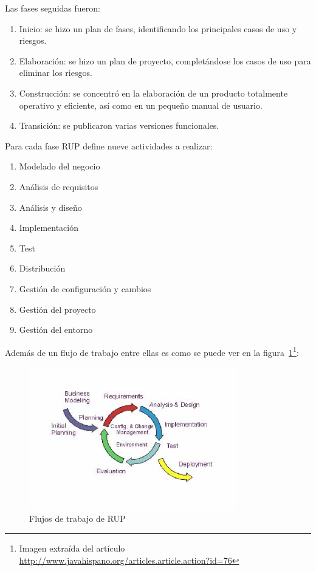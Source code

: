 Las fases seguidas fueron:

\begin{enumerate}
  \item Inicio: se hizo un plan de fases, identificando los principales 
	casos de uso y riesgos.
  \item Elaboración: se hizo un plan de proyecto, completándose los casos 
	de uso para eliminar los riesgos.
  \item Construcción: se concentró en la elaboración de un producto totalmente 
	operativo y eficiente, así como en un pequeño manual de usuario.
  \item Transición: se publicaron varias versiones funcionales.
\end{enumerate}

Para cada fase RUP define nueve actividades a realizar:

\begin{enumerate}
 \item Modelado del negocio
 \item Análisis de requisitos
 \item Análisis y diseño
 \item Implementación
 \item Test
 \item Distribución
 \item Gestión de configuración y cambios
 \item Gestión del proyecto
 \item Gestión del entorno
\end{enumerate}

Además de un flujo de trabajo entre ellas es como se puede ver en la 
figura~\ref{fig:RUPWorkflow}\footnote{Imagen extraída del artículo
\url{http://www.javahispano.org/articles.article.action?id=76}}:

\begin{figure}[ht]
	\centering
	\includegraphics[width=9cm]{images/workflow-rup.png}
	\caption{Flujos de trabajo de RUP}
	\label{fig:RUPWorkflow}
\end{figure}


